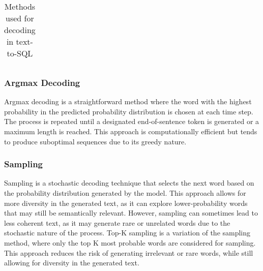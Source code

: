 \begin{table}[H]
\begin{tabular}{cccc}
        \hline
    \end{tabular}
    \caption{Methods used for decoding in text-to-SQL \cite{deng2022recent}}
    \label{tab:decoders}
\end{table}

\subsubsection{Argmax Decoding}

Argmax decoding is a straightforward method where the word with the highest probability in the predicted probability distribution is chosen at each time step. The process is repeated until a designated end-of-sentence token is generated or a maximum length is reached. This approach is computationally efficient but tends to produce suboptimal sequences due to its greedy nature.

\subsubsection{Sampling}

Sampling is a stochastic decoding technique that selects the next word based on the probability distribution generated by the model. This approach allows for more diversity in the generated text, as it can explore lower-probability words that may still be semantically relevant. However, sampling can sometimes lead to less coherent text, as it may generate rare or unrelated words due to the stochastic nature of the process. Top-K sampling is a variation of the sampling method, where only the top K most probable words are considered for sampling. This approach reduces the risk of generating irrelevant or rare words, while still allowing for diversity in the generated text.

